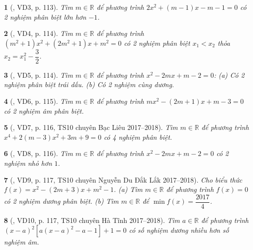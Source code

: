 \documentclass{article}
\newtheorem{baitoan}{}
\begin{document}
\begin{baitoan}[\cite{Thu_Viet_Minh_ptb2}, VD3, p. 113]
	Tìm $m\in\mathbb{R}$ để phương trình $2x^2 + (m - 1)x - m - 1 = 0$ có 2 nghiệm phân biệt lớn hơn $-1$.
\end{baitoan}

\begin{baitoan}[\cite{Thu_Viet_Minh_ptb2}, VD4, p. 114]
	Tìm $m\in\mathbb{R}$ để phương trình $(m^2 + 1)x^2 + (2m^2 + 1)x + m^2 = 0$ có 2 nghiệm phân biệt $x_1 < x_2$ thỏa $x_2 = x_1^2 - \dfrac{3}{2}$.
\end{baitoan}

\begin{baitoan}[\cite{Thu_Viet_Minh_ptb2}, VD5, p. 114]
	Tìm $m\in\mathbb{R}$ để phương trình $x^2 - 2mx + m - 2 = 0$: (a) Có 2 nghiệm phân biệt trái dấu. (b) Có 2 nghiệm cùng dương.
\end{baitoan}

\begin{baitoan}[\cite{Thu_Viet_Minh_ptb2}, VD6, p. 115]
	Tìm $m\in\mathbb{R}$ để phương trình $mx^2 - (2m + 1)x + m - 3 = 0$ có 2 nghiệm âm phân biệt.
\end{baitoan}

\begin{baitoan}[\cite{Thu_Viet_Minh_ptb2}, VD7, p. 116, TS10 chuyên Bạc Liêu 2017--2018]
	Tìm $m\in\mathbb{R}$ để phương trình $x^4 + 2(m - 3)x^2 + 3m + 9 = 0$ có 4 nghiệm phân biệt.
\end{baitoan}

\begin{baitoan}[\cite{Thu_Viet_Minh_ptb2}, VD8, p. 116]
	Tìm $m\in\mathbb{R}$ để phương trình $x^2 - 2mx + m - 2 = 0$ có 2 nghiệm nhỏ hơn $1$.
\end{baitoan}

\begin{baitoan}[\cite{Thu_Viet_Minh_ptb2}, VD9, p. 117, TS10 chuyên Nguyễn Du Đắk Lắk 2017--2018]
	Cho biểu thức $f(x) = x^2 - (2m + 3)x + m^2 - 1$. (a) Tìm $m\in\mathbb{R}$ để phương trình $f(x) = 0$ có 2 nghiệm dương phân biệt. (b) Tìm $m\in\mathbb{R}$ để $\min f(x) = \dfrac{2017}{4}$.
\end{baitoan}

\begin{baitoan}[\cite{Thu_Viet_Minh_ptb2}, VD10, p. 117, TS10 chuyên Hà Tĩnh 2017--2018]
	Tìm $a\in\mathbb{R}$ để phương trình $(x - a)^2\left[a(x - a)^2 - a - 1\right] + 1 = 0$ có số nghiệm dương nhiều hơn số nghiệm âm.
\end{baitoan}
\end{document}
